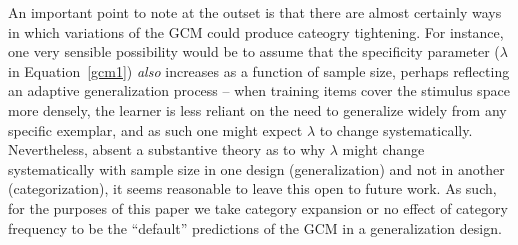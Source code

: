 \documentclass[doc,apacite]{apa6}
\begin{document}
An important point to note at the outset is that there are almost certainly ways in which variations of the GCM could produce cateogry tightening. For instance, one very sensible possibility would be to assume that the specificity parameter ($\lambda$ in Equation~\ref{gcm1}) {\it also} increases as a function of sample size, perhaps reflecting an adaptive generalization process -- when training items cover the stimulus space more densely, the learner is less reliant on the need to generalize widely from any specific exemplar, and as such one might expect $\lambda$ to change systematically. Nevertheless, absent a substantive theory as to why $\lambda$ might change systematically with sample size in one design (generalization) and not in another (categorization), it seems reasonable to leave this open to future work. As such, for the purposes of this paper we take category expansion or no effect of category frequency to be the ``default'' predictions of the GCM in a generalization design.




\end{document}
